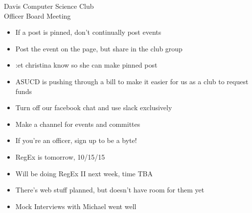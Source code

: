 \documentclass{article}
\begin{document}
\begin{Minutes}{Davis Computer Science Club\\Officer Board Meeting}




\maketitle

\begin{itemize}
    \item If a post is pinned, don’t continually post events
    \item Post the event on the page, but share in the club group
	\item :et christina know so she can make pinned post 
    \item ASUCD is pushing through a bill to make it easier for us as a club to request funds
    \item Turn off our facebook chat and use slack exclusively
    \item Make a channel for events and committes
\end{itemize}

\begin {itemize}
    \item If you're an officer, sign up to be a byte!
\end {itemize}


\begin {itemize} 
    \item RegEx is tomorrow, 10/15/15
    \item Will be doing RegEx II next week, time TBA
	\item There's web stuff planned, but doesn’t have room for them yet
\end {itemize}

\begin {itemize}
    \item Mock Interviews with Michael went well
\end {itemize}


\end{Minutes}
\end{document}
